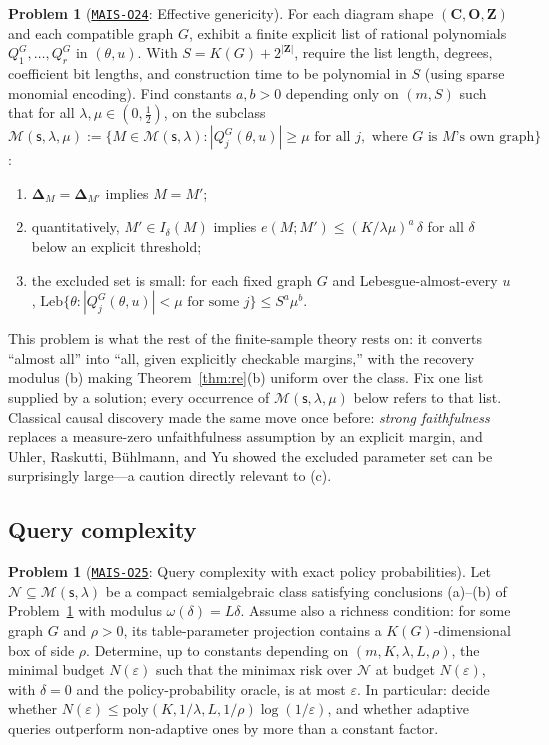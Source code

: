 \documentclass[11pt]{amsart}
\newcommand{\Oid}[1]{\href{https://github.com/lionellevine/MAIS/blob/main/open-problems/MAIS-O#1.md}{\texttt{MAIS-O#1}}}
\theoremstyle{plain}
\theoremstyle{definition}
\newtheorem{problem}[theorem]{Problem}
\newcommand{\bC}{\mathbf{C}}
\newcommand{\bO}{\mathbf{O}}
\newcommand{\bZ}{\mathbf{Z}}
\newcommand{\MM}{\mathcal{M}}
\newcommand{\sk}{\mathsf{s}}
\begin{document}
\begin{problem}[\Oid{24}: Effective genericity]\label{prob:effective}
For each diagram shape $(\bC,\bO,\bZ)$ and each compatible graph $G$, exhibit a finite explicit list of rational polynomials $Q^G_1,\dots,Q^G_r$ in $(\theta,u)$. With $S=K(G)+2^{|\bZ|}$, require the list length, degrees, coefficient bit lengths, and construction time to be polynomial in $S$ (using sparse monomial encoding). Find constants $a,b>0$ depending only on $(m,S)$ such that for all $\lambda,\mu\in(0,\tfrac12)$, on the subclass
$\MM(\sk,\lambda,\mu):=\{M\in\MM(\sk,\lambda): |Q^G_j(\theta,u)|\ge\mu \text{ for all } j, \text{ where } G \text{ is } M\text{'s own graph}\}$:
\begin{enumerate}
\item[(a)] $\boldsymbol\Delta_M=\boldsymbol\Delta_{M'}$ implies $M=M'$;
\item[(b)] quantitatively, $M'\in I_\delta(M)$ implies $e(M;M')\le (K/\lambda\mu)^{a}\,\delta$ for all $\delta$ below an explicit threshold;
\item[(c)] the excluded set is small: for each fixed graph $G$ and Lebesgue-almost-every $u$, $\mathrm{Leb}\bigl\{\theta: |Q^G_j(\theta,u)|<\mu \text{ for some } j\bigr\}\le S^{a}\mu^{b}$.
\end{enumerate}
\end{problem}

This problem is what the rest of the finite-sample theory rests on: it converts ``almost all'' into ``all, given explicitly checkable margins,'' with the recovery modulus (b) making Theorem~\ref{thm:re}(b) uniform over the class. Fix one list supplied by a solution; every occurrence of $\MM(\sk,\lambda,\mu)$ below refers to that list. Classical causal discovery made the same move once before: \emph{strong faithfulness} replaces a measure-zero unfaithfulness assumption by an explicit margin, and Uhler, Raskutti, B\"uhlmann, and Yu \cite{uhler2013} showed the excluded parameter set can be surprisingly large---a caution directly relevant to (c).

\subsection{Query complexity}

\begin{problem}[\Oid{25}: Query complexity with exact policy probabilities]\label{prob:exact}
Let $\mathcal{N}\subseteq\MM(\sk,\lambda)$ be a compact semialgebraic class satisfying conclusions (a)--(b) of Problem~\ref{prob:effective} with modulus $\omega(\delta)=L\delta$. Assume also a richness condition: for some graph $G$ and $\rho>0$, its table-parameter projection contains a $K(G)$-dimensional box of side $\rho$. Determine, up to constants depending on $(m,K,\lambda,L,\rho)$, the minimal budget $N(\varepsilon)$ such that the minimax risk over $\mathcal{N}$ at budget $N(\varepsilon)$, with $\delta=0$ and the policy-probability oracle, is at most $\varepsilon$. In particular: decide whether $N(\varepsilon)\le \mathrm{poly}(K,1/\lambda,L,1/\rho)\log(1/\varepsilon)$, and whether adaptive queries outperform non-adaptive ones by more than a constant factor.
\end{problem}
\end{document}

